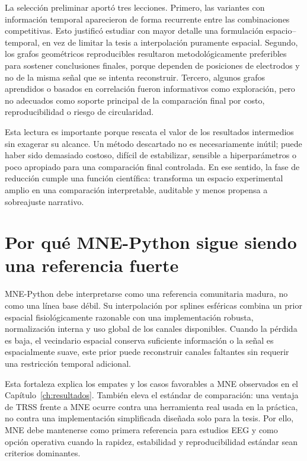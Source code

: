 La selección preliminar aportó tres lecciones. Primero, las variantes con información temporal aparecieron de forma recurrente entre las combinaciones competitivas. Esto justificó estudiar con mayor detalle una formulación espacio--temporal, en vez de limitar la tesis a interpolación puramente espacial. Segundo, los grafos geométricos reproducibles resultaron metodológicamente preferibles para sostener conclusiones finales, porque dependen de posiciones de electrodos y no de la misma señal que se intenta reconstruir. Tercero, algunos grafos aprendidos o basados en correlación fueron informativos como exploración, pero no adecuados como soporte principal de la comparación final por costo, reproducibilidad o riesgo de circularidad.

Esta lectura es importante porque rescata el valor de los resultados intermedios sin exagerar su alcance. Un método descartado no es necesariamente inútil; puede haber sido demasiado costoso, difícil de estabilizar, sensible a hiperparámetros o poco apropiado para una comparación final controlada. En ese sentido, la fase de reducción cumple una función científica: transforma un espacio experimental amplio en una comparación interpretable, auditable y menos propensa a sobreajuste narrativo.

\section{Por qué MNE-Python sigue siendo una referencia fuerte}

MNE-Python debe interpretarse como una referencia comunitaria madura, no como una línea base débil. Su interpolación por splines esféricas combina un prior espacial fisiológicamente razonable con una implementación robusta, normalización interna y uso global de los canales disponibles. Cuando la pérdida es baja, el vecindario espacial conserva suficiente información o la señal es espacialmente suave, este prior puede reconstruir canales faltantes sin requerir una restricción temporal adicional.

Esta fortaleza explica los empates y los casos favorables a MNE observados en el Capítulo~\ref{ch:resultados}. También eleva el estándar de comparación: una ventaja de TRSS frente a MNE ocurre contra una herramienta real usada en la práctica, no contra una implementación simplificada diseñada solo para la tesis. Por ello, MNE debe mantenerse como primera referencia para estudios EEG y como opción operativa cuando la rapidez, estabilidad y reproducibilidad estándar sean criterios dominantes.

